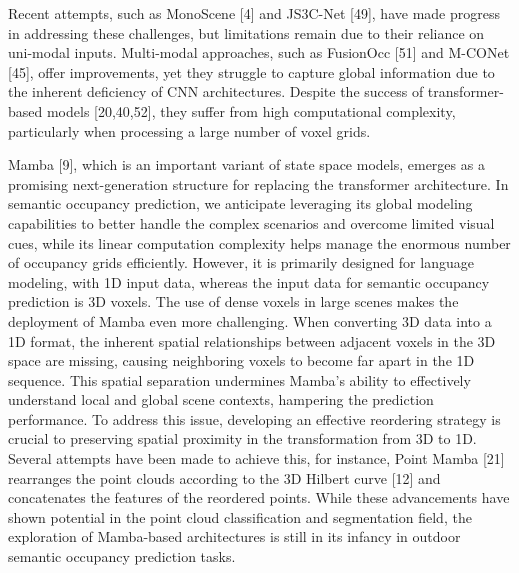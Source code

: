 \documentclass[10pt,twocolumn,letterpaper]{article}
\begin{document}
Recent attempts, such as MonoScene [4] and JS3C-Net [49], have made progress in addressing these challenges, but limitations remain due to their reliance on uni-modal inputs. Multi-modal approaches, such as FusionOcc [51] and M-CONet [45], offer improvements, yet they struggle to capture global information due to the inherent deficiency of CNN architectures. Despite the success of transformer-based models [20,40,52], they suffer from high computational complexity, particularly when processing a large number of voxel grids.

Mamba [9], which is an important variant of state space models, emerges as a promising next-generation structure for replacing the transformer architecture. In semantic occupancy prediction, we anticipate leveraging its global modeling capabilities to better handle the complex scenarios and overcome limited visual cues, while its linear computation complexity helps manage the enormous number of occupancy grids efficiently. However, it is primarily designed for language modeling, with 1D input data, whereas the input data for semantic occupancy prediction is 3D voxels. The use of dense voxels in large scenes makes the deployment of Mamba even more challenging. When converting 3D data into a 1D format, the inherent spatial relationships between adjacent voxels in the 3D space are missing, causing neighboring voxels to become far apart in the 1D sequence. This spatial separation undermines Mamba's ability to effectively understand local and global scene contexts, hampering the prediction performance. To address this issue, developing an effective reordering strategy is crucial to preserving spatial proximity in the transformation from 3D to 1D. Several attempts have been made to achieve this, for instance, Point Mamba [21] rearranges the point clouds according to the 3D Hilbert curve [12] and concatenates the features of the reordered points. While these advancements have shown potential in the point cloud classification and segmentation field, the exploration of Mamba-based architectures is still in its infancy in outdoor semantic occupancy prediction tasks.
\end{document}
